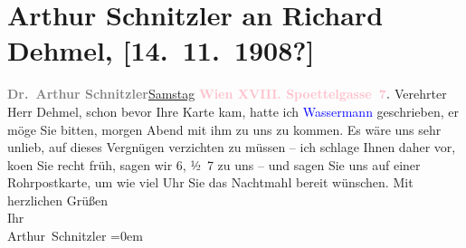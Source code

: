

               \section[Arthur Schnitzler an Richard Dehmel, {[}14. 11. 1908?{]}]{ Arthur Schnitzler an Richard Dehmel,
                    {[}14. 11. 1908?{]}}\nopagebreak{}\rehead{ }\normalsize\beginnumbering{} \toendnotes[C]{\smallbreak\pagebreak[2]} 
\pstart
           \noindent{}{\pb}\textcolor{gray}{\textbf{Dr. Arthur Schnitzler}}\hfill \uline{Samstag}\pend
           \pstart
           \textcolor{gray}{\textbf{\textcolor{pink}{Wien XVIII. Spoettelgasse 7}{}\ledrightnote{\textcolor{pink}{Edmund-Weiß-Gasse}}.}}\pend
           \pstart{}Verehrter Herr Dehmel,\pend\pstart
           schon bevor  Ihre Karte kam, hatte ich \textcolor{blue}{Wassermann}{}\ledrightnote{\textcolor{blue}{Jakob Wassermann}} geschrieben, er möge Sie bitten,
                    morgen Abend mit ihm zu uns zu kommen. Es wäre uns sehr unlieb, auf dieses
                    Vergnügen verzichten \introOben{}zu\introOben{} müssen – ich schlage Ihnen
                    daher vor, ko{\geminationm}en Sie recht früh, sagen wir
                        6, ½ 7 zu uns – und sagen {\pb}Sie uns auf einer Rohrpostkarte, um wie viel Uhr Sie das Nachtmahl bereit
                    wünschen.\pend
           \pstart
           Mit herzlichen Grüßen{\\[\baselineskip]}Ihr{\\[\baselineskip]}\spacefill\mbox{Arthur Schnitzler}\pend
           \leftskip=0em{}\endnumbering{}  
      